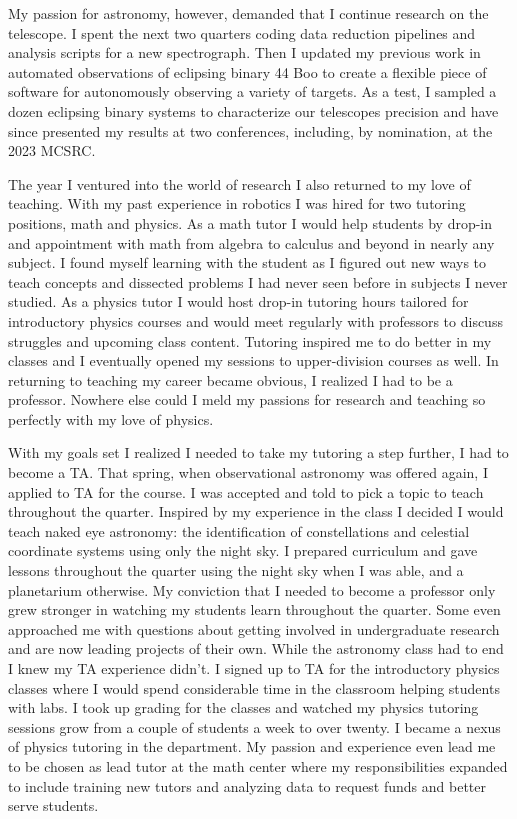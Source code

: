 \documentclass[a4paper, 12pt]{article}
\begin{document}
My passion for astronomy, however, demanded that I continue research on the telescope. I spent the next two quarters coding data reduction pipelines and  analysis scripts for a new spectrograph. Then I updated my previous work in automated observations of eclipsing binary 44 Boo to create a flexible piece of software for autonomously observing a variety of targets. As a test, I sampled a dozen eclipsing binary systems to characterize our telescopes precision and have since presented my results at two conferences, including, by nomination, at the 2023 MCSRC.

The year I ventured into the world of research I also returned to my love of teaching. With my past experience in robotics I was hired for two tutoring positions, math and physics. As a math tutor I would help students by drop-in and appointment with math from algebra to calculus and beyond in nearly any subject. I found myself learning with the student as I figured out new ways to teach concepts and dissected problems I had never seen before in subjects I never studied. As a physics tutor I would host drop-in tutoring hours tailored for introductory physics courses and would meet regularly with professors to discuss struggles and upcoming class content. Tutoring inspired me to do better in my classes and I eventually opened my sessions to upper-division courses as well. In returning to teaching my career became obvious, I realized I had to be a professor. Nowhere else could I meld my passions for research and teaching so perfectly with my love of physics.

With my goals set I realized I needed to take my tutoring a step further, I had to become a TA. That spring, when observational astronomy was offered again, I applied to TA for the course. I was accepted and told to pick a topic to teach throughout the quarter. Inspired by my experience in the class I decided I would teach naked eye astronomy: the identification of constellations and celestial coordinate systems using only the night sky. I prepared curriculum and gave lessons throughout the quarter using the night sky when I was able, and a planetarium otherwise. My conviction that I needed to become a professor only grew stronger in watching my students learn throughout the quarter. Some even approached me with questions about getting involved in undergraduate research and are now leading projects of their own. While the astronomy class had to end I knew my TA experience didn't. I signed up to TA for the introductory physics classes where I would spend considerable time in the classroom helping students with labs. I took up grading for the classes and watched my physics tutoring sessions grow from a couple of students a week to over twenty. I became a nexus of physics tutoring in the department. My passion and experience even lead me to be chosen as lead tutor at the math center where my responsibilities expanded to include training new tutors and analyzing data to request funds and better serve students.
\end{document}
